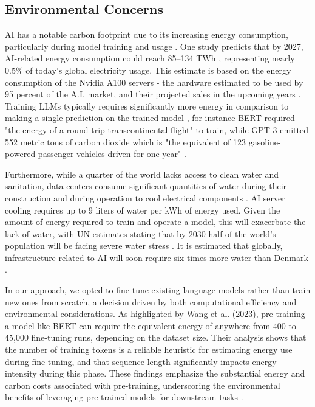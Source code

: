 \documentclass[licencjacka,en]{pracamgr}
\begin{document}
\subsection{Environmental Concerns}
AI has a notable carbon footprint due to its increasing energy consumption, particularly during model training and usage \cite{forbes_dl_env}. One study predicts that by 2027, AI-related energy consumption could reach 85–134 TWh \cite{this_study}, representing nearly 0.5\% of today's global electricity usage. This estimate is based on the energy consumption of the Nvidia A100 servers - the hardware estimated to be used by 95 percent of the A.I. market, and their projected sales in the upcoming years \cite{nyt_el}. Training LLMs typically requires significantly more energy in comparison to making a single prediction on the trained model \cite{sci_dir_comp}, for instance BERT required "the energy of a round-trip transcontinental flight" to train, while GPT-3 emitted 552 metric tons of carbon dioxide which is "the equivalent of 123 gasoline-powered passenger vehicles driven for one year" \cite{sci_am_co2}.

Furthermore, while a quarter of the world lacks access to clean water and sanitation, data centers consume significant quantities of water during their construction and during operation to cool electrical components \cite{first}. AI server cooling requires up to 9 liters of water per kWh of energy used. Given the amount of energy required to train and operate a model, this will exacerbate the lack of water, with UN estimates stating that by 2030 half of the world’s population will be facing severe water stress \cite{water_scarcity}. It is estimated that globally, infrastructure related to AI will soon require six times more water than Denmark \cite{first}.

In our approach, we opted to fine-tune existing language models rather than train new ones from scratch, a decision driven by both computational efficiency and environmental considerations. As highlighted by Wang et al. (2023), pre-training a model like BERT can require the equivalent energy of anywhere from 400 to 45,000 fine-tuning runs, depending on the dataset size. Their analysis shows that the number of training tokens is a reliable heuristic for estimating energy use during fine-tuning, and that sequence length significantly impacts energy intensity during this phase. These findings emphasize the substantial energy and carbon costs associated with pre-training, underscoring the environmental benefits of leveraging pre-trained models for downstream tasks \cite{finetuning_env_good}.
\end{document}
